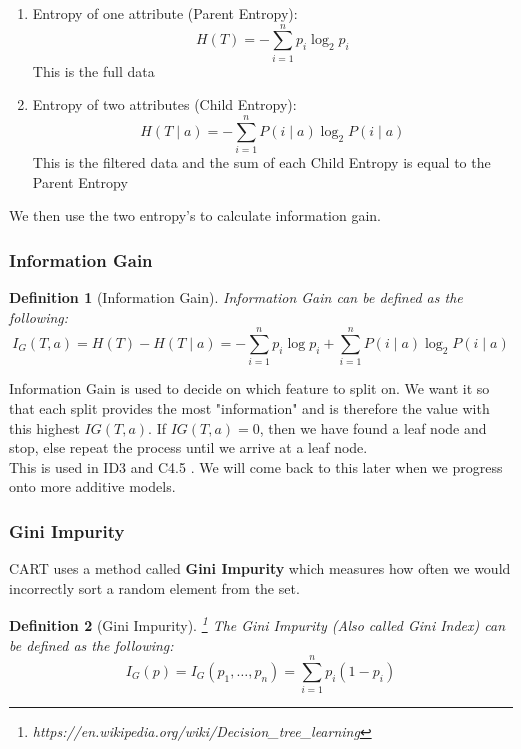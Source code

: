 \documentclass[11pt,a4paper]{report}
\newtheorem{definition}{Definition}
\begin{document}
\begin{enumerate}
    \item Entropy of one attribute (Parent Entropy):
    \begin{equation}
        H(T) = -\sum_{i=1}^{n} p_i \log_2 p_i
    \end{equation}
    This is the full data
    
    \item Entropy of two attributes (Child Entropy):
    \begin{equation}
       H(T \mid a) = -\sum_{i=1}^{n} P(i \mid a) \log_2 P(i \mid a) 
    \end{equation}
    This is the filtered data and the sum of each Child Entropy is equal to the Parent Entropy
\end{enumerate}
We then use the two entropy's to calculate information gain.

\subsubsection{Information Gain}
\begin{definition}[Information Gain]
Information Gain can be defined as the following:
\begin{equation}
    I_G(T,a) = H(T) - H(T \mid a) = -\sum_{i=1}^{n} p_i \log p_i
    + \sum_{i=1}^{n} P(i \mid a) \log_2 P(i \mid a) 
\end{equation}
\end{definition}
Information Gain is used to decide on which feature to split on. We want it so that each split provides the most "information" and is therefore the value with this highest $IG(T,a)$. If $IG(T,a) = 0$, then we have found a leaf node and stop, else repeat the process until we arrive at a leaf node.\\
This is used in ID3 and C4.5 \cite{Quinlan}. We will come back to this later when we progress onto more additive models.

\subsubsection{Gini Impurity}
CART uses a method called \textbf{Gini Impurity} which measures how often we would incorrectly sort a random element from the set. 

\begin{definition}[Gini Impurity]\footnote{https://en.wikipedia.org/wiki/Decision\_tree\_learning}
The Gini Impurity (Also called Gini Index) can be defined as the following:
\begin{equation}
    I_G (p) = I_G (p_1, \dots, p_n) = \sum_{i=1}^{n} p_i(1-p_i) 
\end{equation}
\end{definition} \cite[Metrics]{TreeWiki}
\end{document}
